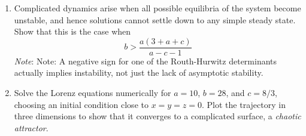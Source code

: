 \documentclass[twoside,10pt,a4paper]{article}
\begin{document}
\begin{enumerate}[label=(\alph*)]
	\item Complicated dynamics arise when all possible equilibria of the system become unstable, and hence solutions cannot settle down to any simple steady state. Show that this is the case when
	\begin{equation*}
		b > \frac{a(3 + a + c)}{a - c - 1}
	\end{equation*}
	\textit{Note}: Note: A negative sign for one of the Routh-Hurwitz determinants actually implies instability, not just the lack of asymptotic stability.
	\item Solve the Lorenz equations numerically for $a=10$, $b=28$, and $c=8/3$, choosing an initial condition close to $x=y=z=0$. Plot the trajectory in three dimensions to show that it converges to a complicated surface, a \textit{chaotic attractor}.
\end{enumerate}
\end{document}
